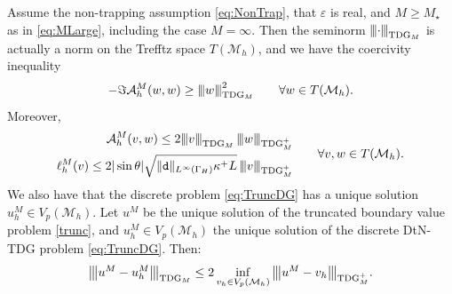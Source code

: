 \documentclass[a4paper,10pt]{article}
\newcommand{\vertiii}[1]{{\left\vert\kern-0.25ex\left\vert\kern-0.25ex\left\vert #1 \right\vert\kern-0.25ex\right\vert\kern-0.25ex\right\vert}}
\newcommand{\Mh}{{\mathcal M_h}}
\newcommand{\cA}{{\mathcal A}}
\newcommand{\pd}{{\mathtt{d}}}
\newcommand{\GH}{{\Gamma_H}}
\begin{document}
\begin{prop} \label{prop:norma}
Assume the non-trapping assumption \eqref{eq:NonTrap}, that $\varepsilon$ is real, and $M\ge M_\star$ as in \eqref{eq:MLarge}, including the case $M=\infty$.
Then the seminorm $\vertiii{\cdot}_{\mathrm{TDG}_M}$ is actually a norm on the Trefftz space $T(\Mh)$, and we have the coercivity inequality
\begin{equation}\label{eq:Coercivity}
	-\Im \cA^M_h(w, w) \geq \vertiii{w}_{\mathrm{TDG}_M}^2
	\qquad {\forall w\in T(\Mh)}.
\end{equation}
Moreover,
\begin{align}\label{eq:ContinuityA}
	\begin{aligned}
		\cA^M_h(v, w) \leq 2 \vertiii{v}_{\mathrm{TDG}_M} \, \vertiii{w}_{\mathrm{TDG}_M^+}
		\\ 
		\ell_h^M(v)\le 2|\sin\theta|\sqrt{\|\pd\|_{L^\infty(\GH)}\kappa^+ L}\, \vertiii{v}_{\mathrm{TDG}_M^+}
	\end{aligned}\qquad{\forall v,w\in T(\Mh)}.
\end{align}
We also have that the discrete problem \eqref{eq:TruncDG} has a unique solution $u_h^M \in V_p(\Mh)$. 
Let $u^M$ be the unique solution of the truncated boundary value problem \eqref{trunc}, and $u_h^M \in V_p(\Mh)$ the unique solution of the discrete DtN-TDG problem \eqref{eq:TruncDG}. 
Then:
\begin{equation} \label{quasiopt}
	\vertiii{u^M - u_h^M}_{\mathrm{TDG}_M} \leq 2 \inf_{v_h \in V_p(\Mh)} \vertiii{u^M - v_h}_{\mathrm{TDG}_M^+}.
\end{equation}
\end{prop}
\end{document}
